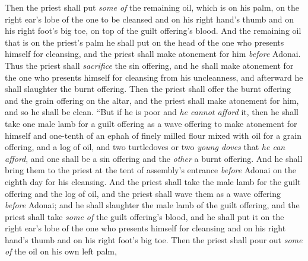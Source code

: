 \begin{biblechapter}
\verse Then the priest shall put \textit{some of} the remaining oil, which is on his palm, on the right ear’s lobe of the one to be cleansed and on his right hand’s thumb and on his right foot’s big toe, on top of the guilt offering’s blood.
\verse And the remaining oil that is on the priest’s palm he shall put on the head of the one who presents himself for cleansing, and the priest shall make atonement for him \textit{before} Adonai.
\verse Thus the priest shall \textit{sacrifice} the sin offering, and he shall make atonement for the one who presents himself for cleansing from his uncleanness, and afterward he shall slaughter the burnt offering.
\verse Then the priest shall offer the burnt offering and the grain offering on the altar, and the priest shall make atonement for him, and so he shall be clean.
\verse “But if he is poor and \textit{he cannot afford} it, then he shall take one male lamb for a guilt offering as a wave offering to make atonement for himself and one-tenth of an ephah of finely milled flour mixed with oil for a grain offering, and a log of oil,
\verse and two turtledoves or two \textit{young doves} that \textit{he can afford}, and one shall be a sin offering and the \textit{other} a burnt offering.
\verse And he shall bring them to the priest at the tent of assembly’s entrance \textit{before} Adonai on the eighth day for his cleansing.
\verse And the priest shall take the male lamb for the guilt offering and the log of oil, and the priest shall wave them as a wave offering \textit{before} Adonai;
\verse and he shall slaughter the male lamb of the guilt offering, and the priest shall take \textit{some of} the guilt offering’s blood, and he shall put it on the right ear’s lobe of the one who presents himself for cleansing and on his right hand’s thumb and on his right foot’s big toe.
\verse Then the priest shall pour out \textit{some of} the oil on his own left palm,

\end{biblechapter}
